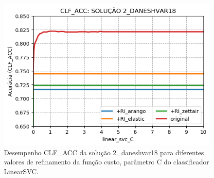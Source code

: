 \begin{figure}[h]
    \centering
    \caption{Desempenho CLF\_ACC da solução 2\_daneshvar18 para diferentes valores de refinamento da função custo, parâmetro C do classificador LinearSVC.}
    \vspace{-0.5cm}
    \begin{center}
        \includegraphics[scale=0.75]{img/clf-acc-2-daneshvar18.png}
    \end{center}
    \vspace{-0.5cm}
    \label{fig:clf-acc-2-daneshvar18}
\end{figure}